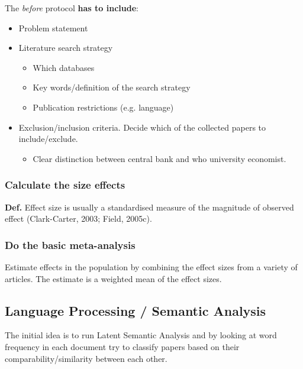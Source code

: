 \documentclass{article}
\begin{document}
The \textit{before} protocol \textbf{has to include}:
\begin{itemize}
    \item Problem statement
    \item Literature search strategy

        \begin{itemize}
            \item Which databases
            \item Key words/definition of the search strategy
            \item Publication restrictions (e.g. language)
        \end{itemize}

    \item Exclusion/inclusion criteria. Decide which of the collected papers to include/exclude.

        \begin{itemize}
            \item Clear distinction between central bank and who university economist.
        \end{itemize}

\end{itemize}

\subsubsection{Calculate the size effects}
\textbf{Def.} Effect size is usually a standardised measure of the magnitude of observed effect (Clark-Carter, 2003; Field, 2005c).

\subsubsection{Do the basic meta-analysis}
Estimate effects in the population by combining
the effect sizes from a variety of articles. The estimate is a weighted mean of the effect sizes. \\




\subsection{Language Processing / Semantic Analysis}
The initial idea is to run Latent Semantic Analysis and by looking at word frequency in each document try to classify papers based on their comparability/similarity between each other.
\end{document}
